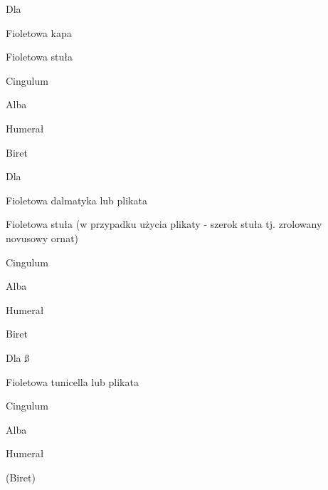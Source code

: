 \begin{paracol}{2}
	\begin{itemize*}
		\item Dla \ii
		\begin{itemize*}
			\item {\color{violet} Fioletowa kapa}
			\item {\color{violet} Fioletowa stuła}
			\item Cingulum
			\item Alba
			\item Humerał
			\item Biret
		\end{itemize*}
		\item Dla \dd
		\begin{itemize*}
			\item {\color{violet} Fioletowa dalmatyka lub plikata}
			\item {\color{violet} Fioletowa stuła} (w przypadku użycia
			      {\color{violet} plikaty} - szerok stuła tj. zrolowany novusowy ornat)
			\item Cingulum
			\item Alba
			\item Humerał
			\item Biret
		\end{itemize*}
		\item Dla \ss
		\begin{itemize*}
			\item {\color{violet} Fioletowa tunicella lub plikata}
			\item Cingulum
			\item Alba
			\item Humerał
			\item (Biret)
		\end{itemize*}
	\end{itemize*}

\end{paracol}